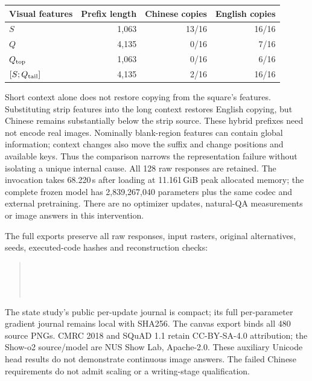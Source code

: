 \begin{center}\small
\begin{tabular}{lrrr}
\toprule
Visual features & Prefix length & Chinese copies & English copies\\
\midrule
$S$ & 1,063 & 13/16 & 16/16\\
$Q$ & 4,135 & 0/16 & 7/16\\
$Q_{\rm top}$ & 1,063 & 0/16 & 6/16\\
$[S;Q_{\rm tail}]$ & 4,135 & 2/16 & 16/16\\
\bottomrule
\end{tabular}
\end{center}
Short context alone does not restore copying from the square's features.
Substituting strip features into the long context restores English copying,
but Chinese remains substantially below the strip source. These hybrid
prefixes need not encode real images. Nominally blank-region features can
contain global information; context changes also move the suffix and change
positions and available keys. Thus the comparison narrows the representation
failure without isolating a unique internal cause. All 128 raw responses
are retained. The invocation takes 68.220\,s after loading at 11.161\,GiB
peak allocated memory; the complete frozen model has 2,839,267,040 parameters
plus the same codec and external pretraining. There are no optimizer updates,
natural-QA measurements or image answers in this intervention.

The full exports preserve all raw responses, input rasters, original
alternatives, seeds, executed-code hashes and reconstruction checks:
\begin{quote}\footnotesize
{}\\
\\
\\
\end{quote}
The state study's public per-update journal is compact; its full per-parameter
gradient journal remains local with SHA256. The canvas export binds all 480
source PNGs. CMRC 2018 and SQuAD 1.1 retain CC-BY-SA-4.0 attribution; the
Show-o2 source/model are NUS Show Lab, Apache-2.0. These auxiliary Unicode
head results do not demonstrate continuous image answers. The failed Chinese
requirements do not admit scaling or a writing-stage qualification.

